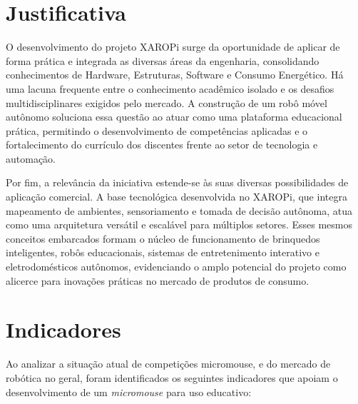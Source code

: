 
\section{Justificativa}

O desenvolvimento do projeto XAROPi surge da oportunidade de aplicar de forma prática e integrada as diversas áreas da engenharia, consolidando conhecimentos de Hardware, Estruturas, Software e Consumo Energético. Há uma lacuna frequente entre o conhecimento acadêmico isolado e os desafios multidisciplinares exigidos pelo mercado. A construção de um robô móvel autônomo soluciona essa questão ao atuar como uma plataforma educacional prática, permitindo o desenvolvimento de competências aplicadas e o fortalecimento do currículo dos discentes frente ao setor de tecnologia e automação.

Por fim, a relevância da iniciativa estende-se às suas diversas possibilidades de aplicação comercial. A base tecnológica desenvolvida no XAROPi, que integra mapeamento de ambientes, sensoriamento e tomada de decisão autônoma, atua como uma arquitetura versátil e escalável para múltiplos setores. Esses mesmos conceitos embarcados formam o núcleo de funcionamento de brinquedos inteligentes, robôs educacionais, sistemas de entretenimento interativo e eletrodomésticos autônomos, evidenciando o amplo potencial do projeto como alicerce para inovações práticas no mercado de produtos de consumo.

\section{Indicadores}

Ao analizar a situação atual de competições micromouse, e do mercado de robótica no geral, foram identificados os seguintes indicadores que apoiam o desenvolvimento de um \textit{micromouse} para uso educativo:

